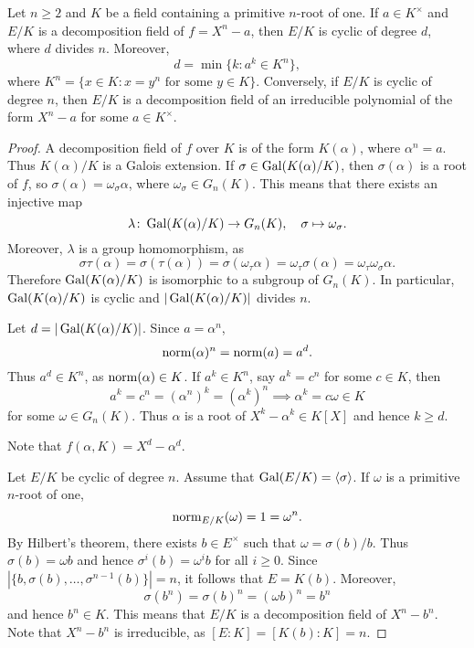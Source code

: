 \chapter{}

\begin{proposition}
    Let $n\geq2$ and $K$ be a field containing a primitive $n$-root of one. If 
    $a\in K^{\times}$ and 
    $E/K$ is a decomposition field of $f=X^n-a$, then $E/K$ is cyclic
    of degree $d$, where $d$ divides $n$. Moreover, 
    \[
    d=\min\{k:a^k\in K^n\},
    \]
    where $K^n=\{x\in K:x=y^n\text{ for some $y\in K$}\}$. 
    Conversely, 
    if $E/K$ is cyclic of degree $n$, then $E/K$ is a decomposition
    field of an irreducible polynomial 
    of the form $X^n-a$ for some $a\in K^{\times}$. 
\end{proposition}

\begin{proof}
    A decomposition field of $f$ over $K$ is
    of the form $K(\alpha)$, where $\alpha^n=a$. Thus 
    $K(\alpha)/K$ is a Galois extension. If $\sigma\in\operatorname{Gal}(K(\alpha)/K)$, 
    then $\sigma(\alpha)$ is a root of $f$, so 
    $\sigma(\alpha)=\omega_\sigma\alpha$, where
    $\omega_\sigma\in G_n(K)$. This means that 
    there exists an injective map
    \[
    \lambda\colon\operatorname{Gal}(K(\alpha)/K)\to G_n(K),
    \quad
    \sigma\mapsto\omega_{\sigma}.
    \]
    Moreover, $\lambda$ is a group homomorphism, as 
    \[
    \sigma\tau(\alpha)=\sigma(\tau(\alpha))=\sigma(\omega_{\tau}\alpha)=\omega_\tau\sigma(\alpha)=\omega_{\tau}\omega_{\sigma}\alpha.
    \]
    Therefore $\operatorname{Gal}(K(\alpha)/K)$ is isomorphic to a subgroup
    of $G_n(K)$. In particular, $\operatorname{Gal}(K(\alpha)/K)$ is cyclic
    and $|\operatorname{Gal}(K(\alpha)/K)|$ divides $n$.
    
    
    Let $d=|\operatorname{Gal}(K(\alpha)/K)|$. Since $a=\alpha^n$, 
    \[
    \operatorname{norm}(\alpha)^n=\operatorname{norm}(a)=a^d.
    \]
    Thus $a^d\in K^n$, as $\operatorname{norm}(\alpha)\in K$. If $a^k\in K^n$, 
    say $a^k=c^n$ for some $c\in K$, then 
    \[
    a^k=c^n=(\alpha^n)^k=(\alpha^k)^n
    \implies 
    \alpha^k=c\omega\in K
    \]
    for some $\omega\in G_n(K)$. Thus $\alpha$ is a root of $X^k-\alpha^k\in K[X]$
    and hence $k\geq d$. 
    
    Note that $f(\alpha,K)=X^d-\alpha^d$. 
    
    Let $E/K$ be cyclic of degree $n$. Assume that  
    $\operatorname{Gal}(E/K)=\langle\sigma\rangle$.
    If $\omega$ is a primitive
    $n$-root of one, 
    \[
    \operatorname{norm}_{E/K}(\omega)=1=\omega^n.
    \]
    By Hilbert's theorem, 
    there exists $b\in E^{\times}$ such that 
    $\omega=\sigma(b)/b$. Thus
    $\sigma(b)=\omega b$ and hence 
    $\sigma^i(b)=\omega^i b$ for all $i\geq0$. Since 
    $|\{b,\sigma(b),\dots,\sigma^{n-1}(b)\}|=n$, 
    it follows that $E=K(b)$. Moreover, 
    \[
    \sigma(b^n)=\sigma(b)^n=(\omega b)^n=b^n
    \]
    and hence $b^n\in K$. This means that $E/K$ is a decomposition
    field of $X^n-b^n$. Note that $X^n-b^n$ is irreducible, as 
    $[E:K]=[K(b):K]=n$. 
\end{proof}


